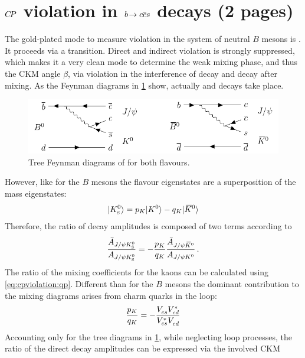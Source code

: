 
\section{\texorpdfstring{${C\!P}$}{CP} violation in \texorpdfstring{${b}\!\rightarrow {\ensuremath{c}}{\ensuremath{\overline {{c}}}}{\ensuremath{s}}$}{bToccbars} decays (2 pages)}
\label{sec:cpviolation:btoccbars}

The gold-plated mode to measure \CP violation in the system of neutral $B$
mesons is \BdToJPsiKS. It proceeds via a \bToccbars transition. Direct and
indirect \CP violation is strongly suppressed, which makes it a very clean
mode to determine the weak mixing phase, and thus the CKM angle $\beta$, via
\CP violation in the interference of decay and decay after mixing. As the
Feynman diagrams in \cref{fig:cpviolation:bd2jpsiks_feynmans} show, actually
\BdToJPsiKz and \BdbToJPsiKzb decays take place.
\begin{figure}[htb]
\centering
\includegraphics[width=\textwidth]{03-CPViolation/tikz/pdf/BdToJPsiKS.pdf}
\caption{Tree Feynman diagrams of \BdToJPsiKS for both flavours.}
\label{fig:cpviolation:bd2jpsiks_feynmans}
\end{figure}
However, like for the $B$ mesons the flavour eigenstates are a superposition
of the \CP mass eigenstates:
\begin{align}
	|{{K}^0_{\mathrm{ \scriptscriptstyle S}}}\rangle = p_K |{{K}^0}\rangle - q_K |{{\kern 0.2em\overline{\kern -0.2em K}{}}{}^0}\rangle
\end{align}
Therefore, the ratio of decay amplitudes is composed of two terms according to
\begin{align}
	\frac{\bar{A}_{J/\psi{\ensuremath{{K}^0_{\mathrm{ \scriptscriptstyle S}}}}}}{A_{J/\psi{\ensuremath{{K}^0_{\mathrm{ \scriptscriptstyle S}}}}}} = -\frac{p_K}{q_K}\frac{\bar{A}_{J/\psi{\ensuremath{{\kern 0.2em\overline{\kern -0.2em K}{}}{}^0}}}}{A_{J/\psi{\ensuremath{{K}^0}}}}\,.
\end{align}
The ratio of the mixing coefficients for the kaons can be calculated using
\cref{eq:cpviolation:qp}. Different than for the $B$ mesons the dominant
contribution to the mixing diagrams arises from charm quarks in the loop:
\begin{align}
	\frac{p_K}{q_K} = -\frac{{V_{{c}{s}}^{}}{V_{{c}{d}}^\ast}}{{V_{{c}{s}}^\ast}{V_{{c}{d}}^{}}}
\end{align}
Accounting only for the tree diagrams in
\cref{fig:cpviolation:bd2jpsiks_feynmans}, while neglecting loop processes,
the ratio of the direct decay amplitudes can be expressed via the involved CKM
